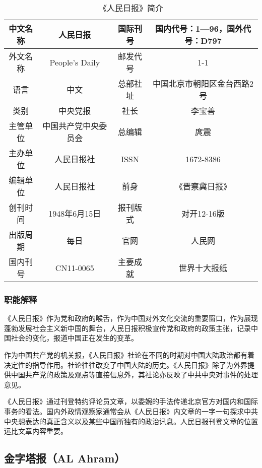 \documentclass[a4paper,openany]{book}
\begin{document}
\begin{table}[ht]
\centering
\setlength{\belowcaptionskip}{5pt}
\caption{《人民日报》简介}
\begin{tabular}{|c|c|c|c|}
\hline
中文名称   & 人民日报           & 国际刊号   & 国内代号：1—96，国外代号：D797  \\ \hline
外文名称   & People's Daily & 邮发代号   & 1-1                         \\ \hline
语言 & 中文             & 总部社址   & 中国北京市朝阳区金台西路2号              \\ \hline
类别 & 中央党报           & 社长 & 李宝善                         \\ \hline
主管单位   & 中国共产党中央委员会     & 总编辑    & 庹震                          \\ \hline
主办单位   & 人民日报社          & ISSN   & 1672-8386                   \\ \hline
编辑单位   & 人民日报社          & 前身 & 《晋察冀日报》                     \\ \hline
创刊时间   & 1948年6月15日     & 报刊版式   & 对开12-16版                    \\ \hline
出版周期   & 每日             & 官网 & 人民网                         \\ \hline
国内刊号   & CN11-0065      & 主要成就   & 世界十大报纸                      \\ \hline
\end{tabular}
\end{table}

\subsubsection{职能解释}

《人民日报》作为党和政府的喉舌，作为中国对外文化交流的重要窗口，作为展现蓬勃发展社会主义新中国的舞台，人民日报积极宣传党和政府的政策主张，记录中国社会的变化，报道中国正在发生的变革。

作为中国共产党的机关报，《人民日报》社论在不同的时期对中国大陆政治都有着决定性的指导作用。社论往往改变了中国大陆的历史。《人民日报》除了为外界提供中国共产党的政策及观点等直接信息外，其社论亦反映了中共中央对事件的处理意见。

《人民日报》通过刊登特约评论员文章，以委婉的手法传递北京官方对国内和国际事务的看法。国内外政情观察家通常会从《人民日报》内文章的一字一句探求中共中央想表达的真正含义以及某些中国所独有的政治讯息。人民日报刊登文章的位置远比文章内容重要。

\subsection{金字塔报（AL Ahram）}
\end{document}

